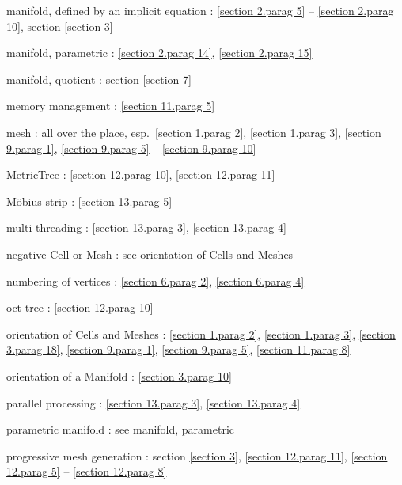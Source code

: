 \documentclass[a4paper]{scrreprt}
\def\numb{}
\newcommand\verm[1]{\textcolor{manif}{#1}}
\renewcommand\tt{\normalfont\ttfamily}
\begin{document}
\noindent
manifold, defined by an implicit equation :
\ref{\numb section 2.\numb parag 5} -- \ref{\numb section 2.\numb parag 10},
section \ref{\numb section 3}

\noindent
manifold, parametric : \ref{\numb section 2.\numb parag 14},
\ref{\numb section 2.\numb parag 15}

\noindent
manifold, quotient : section \ref{\numb section 7}

\noindent
memory management : \ref{\numb section 11.\numb parag 5}

\noindent
mesh : all over the place, esp.\ \ref{\numb section 1.\numb parag 2},
\ref{\numb section 1.\numb parag 3}, \ref{\numb section 9.\numb parag 1},
\ref{\numb section 9.\numb parag 5} -- \ref{\numb section 9.\numb parag 10}

\noindent
{\small\tt \verm{MetricTree}} : \ref{\numb section 12.\numb parag 10},
\ref{\numb section 12.\numb parag 11}

\noindent
M\"obius strip : \ref{\numb section 13.\numb parag 5}

\noindent
multi-threading : \ref{\numb section 13.\numb parag 3}, \ref{\numb section 13.\numb parag 4}

\noindent
negative {\small\tt \verm{Cell}} or {\small\tt \verm{Mesh}} :
see orientation of {\small\tt \verm{Cell}}s and {\small\tt \verm{Mesh}}es

\noindent
numbering of vertices :
\ref{\numb section 6.\numb parag 2}, \ref{\numb section 6.\numb parag 4}

\noindent
oct-tree : \ref{\numb section 12.\numb parag 10}

\noindent
orientation of {\small\tt \verm{Cell}}s and {\small\tt \verm{Mesh}}es :
\ref{\numb section 1.\numb parag 2}, \ref{\numb section 1.\numb parag 3},
\ref{\numb section 3.\numb parag 18}, \ref{\numb section 9.\numb parag 1},
\ref{\numb section 9.\numb parag 5}, \ref{\numb section 11.\numb parag 8}

\noindent
orientation of a {\small\tt \verm{Manifold}} : \ref{\numb section 3.\numb parag 10}

\noindent
parallel processing : \ref{\numb section 13.\numb parag 3}, \ref{\numb section 13.\numb parag 4}

\noindent
parametric manifold : see manifold, parametric

\noindent
progressive mesh generation : section \ref{\numb section 3},
\ref{\numb section 12.\numb parag 11},
\ref{\numb section 12.\numb parag 5} -- \ref{\numb section 12.\numb parag 8}
\end{document}
